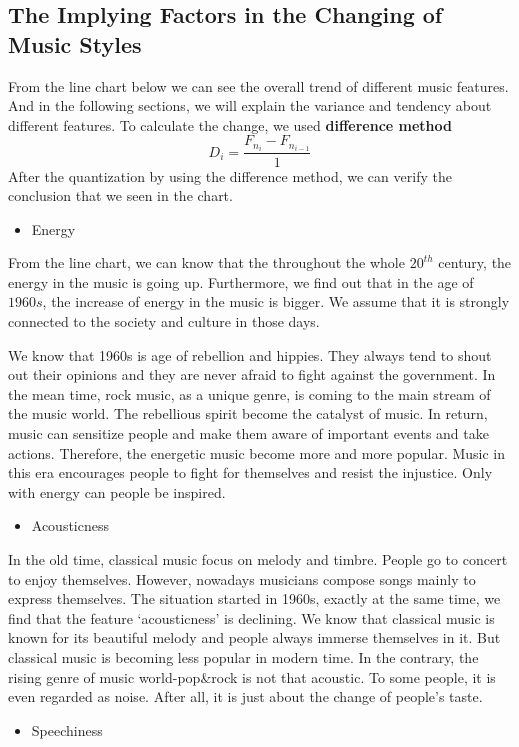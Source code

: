 \documentclass[12pt]{article}
\begin{document}
\subsection{The Implying Factors in the Changing of Music Styles}\quad\;
From the line chart below we can see the overall trend of different music features. And in the following sections,
 we will explain the variance and tendency about different features. To calculate the change, we used \textbf{difference method}
$$D_{i}=\frac{F_{n_i}-F_{n_{i-1}}}{1}$$
After the quantization by using the difference method, we can verify the conclusion that we seen in the chart.
\begin{itemize}
\item Energy
\end{itemize}\quad\;
From the line chart, we can know that the throughout the whole $20^{th}$ century, the energy in the music is going up.
Furthermore, we find out that in the age of $1960s$, the increase of energy in the music is bigger. We assume that it is 
strongly connected to the society and culture in those days.\par
We know that 1960s is age of rebellion and hippies. They always tend to shout out their opinions and they 
are never afraid to fight against the government. In the mean time, rock music, as a unique genre, is coming
to the main stream of the music world. The rebellious spirit become the catalyst of music. In return, music can
 sensitize people and make them aware of important events and take actions.\cite{4} Therefore, the energetic music become 
more and more popular. Music in this era encourages people to fight for themselves and resist the injustice.
Only with energy can people be inspired.
\begin{itemize}
\item Acousticness
\end{itemize}\quad\;
In the old time, classical music focus on melody and timbre. People go to concert to enjoy themselves. However,
nowadays musicians compose songs mainly to express themselves. The situation started in 1960s, exactly at the 
same time, we find that the feature `acousticness' is declining. We know that classical music is known for its
beautiful melody and people always immerse themselves in it. But classical music is becoming less popular 
in modern time. In the contrary, the rising genre of music world-pop\&rock is not that acoustic. To some people,
it is even regarded as noise. After all, it is just about the change of people's taste.
\begin{itemize}
\item Speechiness
\end{itemize}\quad\;
\end{document}
